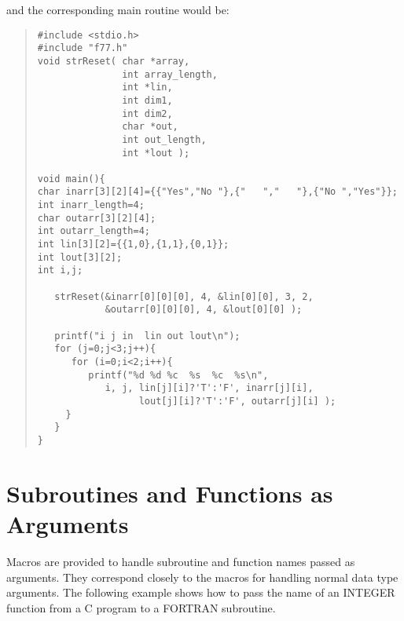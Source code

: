 \documentclass[twoside,11pt]{article}
\newcommand{\xlabel}[1]{}
\renewcommand{\_}{\texttt{\symbol{95}}}
\begin{document}
and the corresponding main routine would be:
{\small \begin{quote} \begin{verbatim}
#include <stdio.h>
#include "f77.h"
void strReset( char *array,
               int array_length,
               int *lin,
               int dim1,
               int dim2,
               char *out,
               int out_length,
               int *lout );

void main(){
char inarr[3][2][4]={{"Yes","No "},{"   ","   "},{"No ","Yes"}};
int inarr_length=4;
char outarr[3][2][4];
int outarr_length=4;
int lin[3][2]={{1,0},{1,1},{0,1}};
int lout[3][2];
int i,j;

   strReset(&inarr[0][0][0], 4, &lin[0][0], 3, 2, 
            &outarr[0][0][0], 4, &lout[0][0] );

   printf("i j in  lin out lout\n");
   for (j=0;j<3;j++){
      for (i=0;i<2;i++){
         printf("%d %d %c  %s  %c  %s\n",
            i, j, lin[j][i]?'T':'F', inarr[j][i], 
                  lout[j][i]?'T':'F', outarr[j][i] );
     }
   }
}
\end{verbatim} \end{quote} }

\section{\xlabel{subroutines_and_functions_as_arguments}\label{f77_externalargs}Subroutines and Functions as Arguments}

Macros are provided to handle subroutine and function names passed as
arguments. They correspond closely to the macros for handling normal data
type arguments.
The following example shows how to pass the name of an INTEGER function from
a C program to a FORTRAN subroutine.
\end{document}
